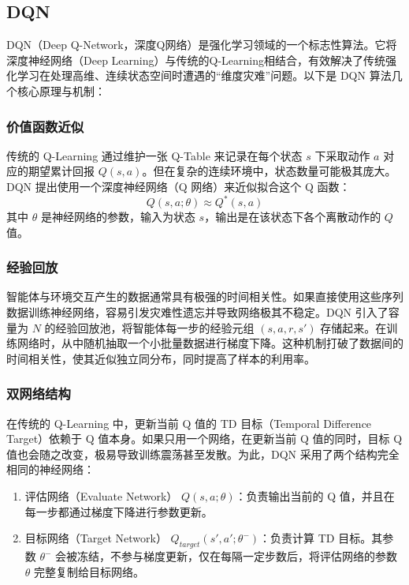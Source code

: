 \subsection{DQN}
DQN（Deep Q-Network，深度Q网络）是强化学习领域的一个标志性算法。它将深度神经网络（Deep Learning）与传统的Q-Learning相结合，有效解决了传统强化学习在处理高维、连续状态空间时遭遇的“维度灾难”问题。\cite{DQN}以下是 DQN 算法几个核心原理与机制：

\subsubsection{价值函数近似}
传统的 Q-Learning 通过维护一张 Q-Table 来记录在每个状态 $s$ 下采取动作 $a$ 对应的期望累计回报 $Q(s, a)$。\cite{tai2016robot}但在复杂的连续环境中，状态数量可能极其庞大。DQN 提出使用一个深度神经网络（Q 网络）来近似拟合这个 Q 函数：
\begin{equation}
    Q(s, a; \theta) \approx Q^*(s, a)
\end{equation}
其中 $\theta$ 是神经网络的参数，输入为状态 $s$，输出是在该状态下各个离散动作的 $Q$ 值。

\subsubsection{经验回放}
智能体与环境交互产生的数据通常具有极强的时间相关性。如果直接使用这些序列数据训练神经网络，容易引发灾难性遗忘并导致网络极其不稳定。DQN 引入了容量为 $N$ 的经验回放池，将智能体每一步的经验元组 $(s, a, r, s')$ 存储起来。在训练网络时，从中随机抽取一个小批量数据进行梯度下降。这种机制打破了数据间的时间相关性，使其近似独立同分布，同时提高了样本的利用率。

\subsubsection{双网络结构}
在传统的 Q-Learning 中，更新当前 Q 值的 TD 目标（Temporal Difference Target）依赖于 Q 值本身。如果只用一个网络，在更新当前 Q 值的同时，目标 Q 值也会随之改变，极易导致训练震荡甚至发散。为此，DQN 采用了两个结构完全相同的神经网络：
\begin{enumerate}
    \item 评估网络（Evaluate Network） $Q(s, a; \theta)$：负责输出当前的 Q 值，并且在每一步都通过梯度下降进行参数更新。
    \item 目标网络（Target Network） $Q_{target}(s', a'; \theta^-)$：负责计算 TD 目标。其参数 $\theta^-$ 会被冻结，不参与梯度更新，仅在每隔一定步数后，将评估网络的参数 $\theta$ 完整复制给目标网络。
\end{enumerate}

